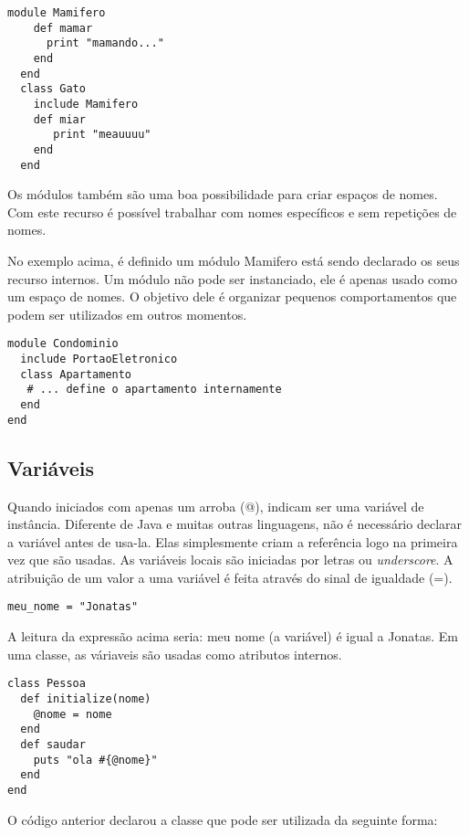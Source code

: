 \documentclass[espaco=simples,appendix=Name]{abnt}
\begin{document}
\begin{lstlisting}[caption=Exemplo de módulo ]
  module Mamifero
    def mamar
      print "mamando..."
    end
  end
  class Gato
    include Mamifero
    def miar
       print "meauuuu"
    end
  end
\end{lstlisting}

Os módulos também são uma boa possibilidade para criar espaços de nomes. Com este recurso é possível trabalhar com nomes específicos e sem repetições de nomes.

No exemplo acima, é definido um módulo Mamifero está sendo declarado os seus recurso internos. Um módulo não pode ser instanciado, ele é apenas usado como um espaço de nomes. O objetivo dele é organizar pequenos comportamentos que podem ser utilizados em outros momentos.

\begin{lstlisting}[caption=Exemplo de módulo como espaço ]
module Condominio
  include PortaoEletronico
  class Apartamento
   # ... define o apartamento internamente
  end
end 
\end{lstlisting}

\subsection{ Variáveis } 

Quando iniciados com apenas um arroba (@), indicam ser uma variável de instância. Diferente de Java e muitas outras linguagens, não é necessário declarar a variável antes de usa-la. Elas simplesmente criam a referência logo na primeira vez que são usadas.
As variáveis locais são iniciadas por letras ou \textit{underscore}.
A atribuição de um valor a uma variável é feita através do sinal de igualdade (=).

\begin{lstlisting}[caption=Exemplo de variável local ]
meu_nome = "Jonatas"
\end{lstlisting}

A leitura da expressão acima seria: meu nome (a variável) é igual a Jonatas.
Em uma classe, as váriaveis são usadas como atributos internos.

\begin{lstlisting}[caption=Exemplo de variável de instância em uma classe ]
class Pessoa
  def initialize(nome)
    @nome = nome
  end
  def saudar
    puts "ola #{@nome}"
  end
end
\end{lstlisting}

O código anterior declarou a classe que pode ser utilizada da seguinte forma:
\end{document}
